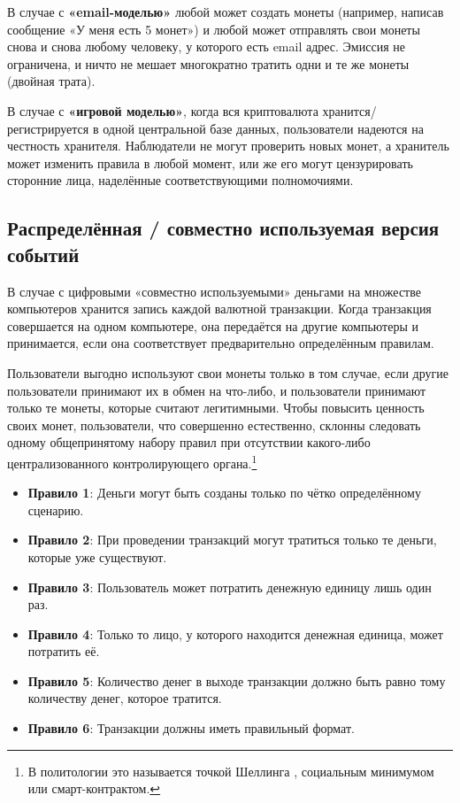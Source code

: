 В случае с \textbf{«email-моделью»} любой может создать монеты (например, написав сообщение «У меня есть 5 монет») и любой может отправлять свои монеты снова и снова любому человеку, у которого есть email адрес. Эмиссия не ограничена, и ничто не мешает многократно тратить одни и те же монеты (двойная трата).

В случае с \textbf{«игровой моделью»}, когда вся криптовалюта хранится/регистрируется в одной центральной базе данных, пользователи надеются на честность хранителя. Наблюдатели не могут проверить новых монет, а хранитель может изменить правила в любой момент, или же его могут цензурировать сторонние лица, наделённые соответствующими полномочиями.


\subsection{Распределённая / совместно используемая версия событий}
\label{subsec:shared-version-events}

В случае с цифровыми «совместно используемыми» деньгами на множестве компьютеров хранится запись каждой валютной транзакции. Когда транзакция совершается на одном компьютере, она передаётся на другие компьютеры и принимается, если она соответствует предварительно определённым правилам.

Пользователи выгодно используют свои монеты только в том случае, если другие пользова\-тели принимают их в обмен на что-либо, и пользователи принимают только те монеты, которые считают легитимными. Чтобы повысить ценность своих монет, пользователи, что совершенно естественно, склонны следовать одному общепринятому набору правил при отсут\-ствии какого-либо централизованного контролирующего органа.\footnote{В политологии это называется точкой Шеллинга \cite{friedman-schelling}, социальным минимумом или смарт-контрактом.}
\begin{itemize}
    \item[] \textbf{Правило 1}: Деньги могут быть созданы только по чётко определённому сценарию.
    \item[] \textbf{Правило 2}: При проведении транзакций могут тратиться только те деньги, которые уже существуют.
    \item[] \textbf{Правило 3}: Пользователь может потратить денежную единицу лишь один раз.
    \item[] \textbf{Правило 4}: Только то лицо, у которого находится денежная единица, может потратить её.
    \item[] \textbf{Правило 5}: Количество денег в выходе транзакции должно быть равно тому количе\-ству денег, которое тратится.
    \item[] \textbf{Правило 6}: Транзакции должны иметь правильный формат.
\end{itemize}

